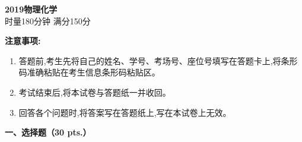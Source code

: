 \begin{center}
    {\LARGE \textbf{2019物理化学}} \\[2ex]
    {\large 时量180分钟 \quad 满分150分}
\end{center}

\vspace{0.5cm}
\noindent\textbf{注意事项:}
\begin{enumerate}[label=\arabic*., parsep=0pt, itemsep=0pt]
    \item 答题前,考生先将自己的姓名、学号、考场号、座位号填写在答题卡上,将条形码准确粘贴在考生信息条形码粘贴区。
    \item 考试结束后,将本试卷与答题纸一并收回。
    \item 回答各个问题时,将答案写在答题纸上,写在本试卷上无效。
\end{enumerate}

\vspace{0.5cm}
\noindent\textbf{一、选择题（30 pts.）}

